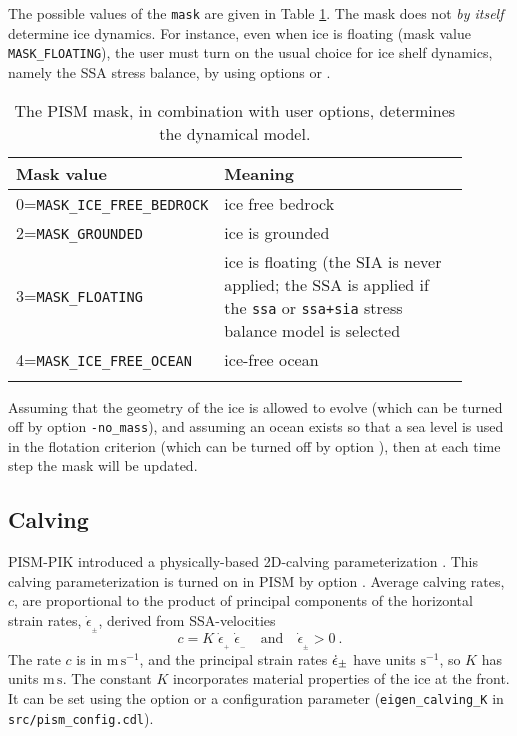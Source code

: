 The possible values of the \texttt{mask} are given in Table \ref{tab:maskvals}.  The mask does not \emph{by itself} determine ice dynamics.  For instance, even when ice is floating (mask value \texttt{MASK_FLOATING}), the user must turn on the usual choice for ice shelf dynamics, namely the SSA stress balance, by using options  or .

\begin{table}[ht]
  \centering
 \small
  \begin{tabular}{p{0.25\linewidth}p{0.65\linewidth}}
    \toprule
    \textbf{Mask value} & \textbf{Meaning}\\
    \midrule
    0=\texttt{MASK_ICE_FREE_BEDROCK} & ice free bedrock \\
    2=\texttt{MASK_GROUNDED}& ice is grounded \\
    3=\texttt{MASK_FLOATING} & ice is floating (the SIA is never applied; the SSA is applied if the \texttt{ssa} or \texttt{ssa+sia} stress balance model is selected\\
    4=\texttt{MASK_ICE_FREE_OCEAN} & ice-free ocean \\
    \\\bottomrule
  \end{tabular}
  \normalsize
  \caption{The PISM mask, in combination with user options, determines the dynamical model.}
  \label{tab:maskvals} 
\end{table}

Assuming that the geometry of the ice is allowed to evolve (which can be turned off by option \texttt{-no_mass}), and assuming an ocean exists so that a sea level is used in the flotation criterion (which can be turned off by option ), then at each time step the mask will be updated.

\subsection{Calving}
\label{sec:calving}

PISM-PIK introduced a physically-based 2D-calving parameterization \cite{Levermannetal2012}.  This calving parameterization is turned on in PISM by option .  Average calving rates, $c$, are proportional to the product of principal components of the horizontal strain rates, $\dot{\epsilon}_{_\pm}$, derived from SSA-velocities 
\begin{equation}
\label{eq: calv2}
c = K\; \dot{\epsilon}_{_+}\; \dot{\epsilon}_{_-}\quad\text{and}\quad\dot{\epsilon}_{_\pm}>0\:.
\end{equation}
The rate $c$ is in $\text{m}\,\text{s}^{-1}$, and the principal strain rates $\dot{\epsilon}_\pm$ have units $\text{s}^{-1}$, so $K$ has units $\text{m}\,\text{s}$.  The constant $K$ incorporates material properties of the ice at the front.  It can be set using the  option or a configuration parameter (\texttt{eigen_calving_K} in \texttt{src/pism_config.cdl}).


